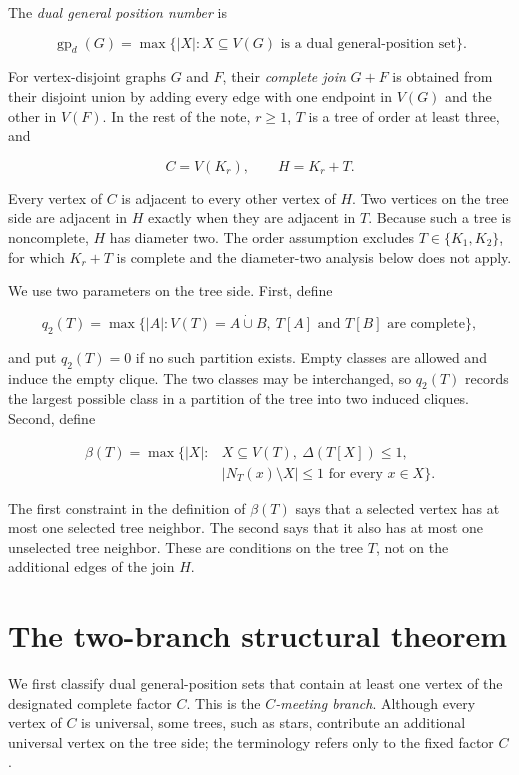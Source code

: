 \documentclass[preprint,12pt]{elsarticle}
\providecommand{\Needspace}[1]{}
\numberwithin{equation}{section}
\begin{document}
\Needspace{6\baselineskip}
The \emph{dual general position number} is

\[
\operatorname{gp}_d(G)=
\max\{|X|:X\subseteq V(G)\text{ is a dual general-position set}\}.
\]

For vertex-disjoint graphs \(G\) and \(F\), their \emph{complete join}
\(G+F\) is obtained from their disjoint union by adding every edge with
one endpoint in \(V(G)\) and the other in \(V(F)\). In the rest of the
note, \(r\ge 1\), \(T\) is a tree of order at least three, and

\[
C=V(K_r),\qquad H=K_r+T.
\]

Every vertex of \(C\) is adjacent to every other vertex of \(H\). Two
vertices on the tree side are adjacent in \(H\) exactly when they are
adjacent in \(T\). Because such a tree is noncomplete, \(H\) has
diameter two. The order assumption excludes \(T\in\{K_1,K_2\}\), for
which \(K_r+T\) is complete and the diameter-two analysis below does not
apply.

We use two parameters on the tree side. First, define

\[
q_2(T)=\max\{|A|:V(T)=A\mathbin{\dot\cup}B,
\ T[A]\text{ and }T[B]\text{ are complete}\},
\]

and put \(q_2(T)=0\) if no such partition exists. Empty classes are
allowed and induce the empty clique. The two classes may be
interchanged, so \(q_2(T)\) records the largest possible class in a
partition of the tree into two induced cliques. Second, define

\[
\begin{aligned}
\beta(T)=\max\bigl\{|X|:{}&X\subseteq V(T),\ \Delta(T[X])\le 1,\\
&|N_T(x)\setminus X|\le 1\text{ for every }x\in X\bigr\}.
\end{aligned}
\]

The first constraint in the definition of \(\beta(T)\) says that a
selected vertex has at most one selected tree neighbor. The second says
that it also has at most one unselected tree neighbor. These are
conditions on the tree \(T\), not on the additional edges of the join
\(H\).

\section{The two-branch structural theorem}\label{sec:structure}

We first classify dual general-position sets that contain at least one
vertex of the designated complete factor \(C\). This is the
\emph{\(C\)-meeting branch}. Although every vertex of \(C\) is universal,
some trees, such as stars, contribute an additional universal vertex on
the tree side; the terminology refers only to the fixed factor \(C\).
\end{document}
